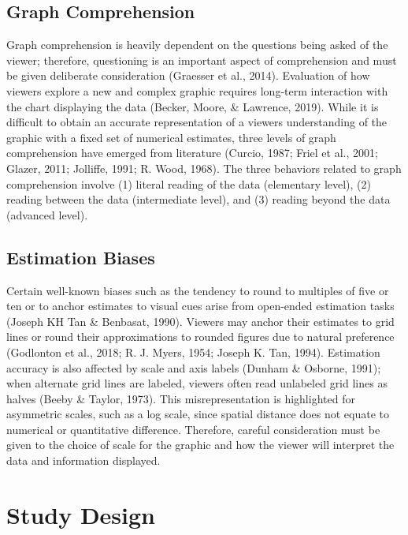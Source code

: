 \documentclass[print]{nuthesis}
\begin{document}
\hypertarget{graph-comprehension-1}{%
\subsection{Graph Comprehension}\label{graph-comprehension-1}}

Graph comprehension is heavily dependent on the questions being asked of the viewer; therefore, questioning is an important aspect of comprehension and must be given deliberate consideration (Graesser et al., 2014).
Evaluation of how viewers explore a new and complex graphic requires long-term interaction with the chart displaying the data (Becker, Moore, \& Lawrence, 2019).
While it is difficult to obtain an accurate representation of a viewers understanding of the graphic with a fixed set of numerical estimates, three levels of graph comprehension have emerged from literature (Curcio, 1987; Friel et al., 2001; Glazer, 2011; Jolliffe, 1991; R. Wood, 1968).
The three behaviors related to graph comprehension involve (1) literal reading of the data (elementary level), (2) reading between the data (intermediate level), and (3) reading beyond the data (advanced level).

\hypertarget{estimation-biases-1}{%
\subsection{Estimation Biases}\label{estimation-biases-1}}

Certain well-known biases such as the tendency to round to multiples of five or ten or to anchor estimates to visual cues arise from open-ended estimation tasks (Joseph KH Tan \& Benbasat, 1990).
Viewers may anchor their estimates to grid lines or round their approximations to rounded figures due to natural preference (Godlonton et al., 2018; R. J. Myers, 1954; Joseph K. Tan, 1994).
Estimation accuracy is also affected by scale and axis labels (Dunham \& Osborne, 1991); when alternate grid lines are labeled, viewers often read unlabeled grid lines as halves (Beeby \& Taylor, 1973).
This misrepresentation is highlighted for asymmetric scales, such as a log scale, since spatial distance does not equate to numerical or quantitative difference.
Therefore, careful consideration must be given to the choice of scale for the graphic and how the viewer will interpret the data and information displayed.

\hypertarget{study-design-2}{%
\section{Study Design}\label{study-design-2}}
\end{document}
